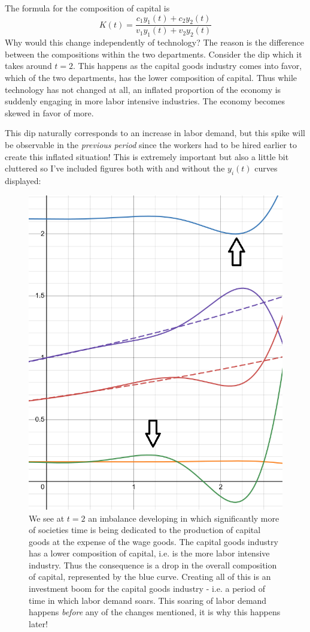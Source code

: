 \documentclass{article}
\theoremstyle{theorem}
\begin{document}
The formula for the composition of capital is
\[ K(t) = \frac{c_1y_1(t) + c_2y_2(t)}{v_1y_1(t) + v_2y_2(t)} \]
Why would this change independently of technology? The reason is the difference between the compositions within the two departments. Consider the dip which it takes around $t=2$. This happens as the capital goods industry comes into favor, which of the two departments, has the lower composition of capital. Thus while technology has not changed at all, an inflated proportion of the economy is suddenly engaging in more labor intensive industries. The economy becomes skewed in favor of more. \par 
This dip naturally corresponds to an increase in labor demand, but this spike will be observable in the \emph{previous period} since the workers had to be hired earlier to create this inflated situation! This is extremely important but also a little bit cluttered so I've included figures both with and without the $y_i(t)$ curves displayed:
\begin{figure}[H]
\centering
\includegraphics[scale=1]{Images/laborDemandWithCurves}
\caption{We see at $t=2$ an imbalance developing in which significantly more of societies time is being dedicated to the production of capital goods at the expense of the wage goods. The capital goods industry has a lower composition of capital, i.e. is the more labor intensive industry. Thus the consequence is a drop in the overall composition of capital, represented by the blue curve. Creating all of this is an investment boom for the capital goods industry - i.e. a period of time in which labor demand soars. This soaring of labor demand happens \emph{before} any of the changes mentioned, it is why this happens later!}
\end{figure}
\end{document}
